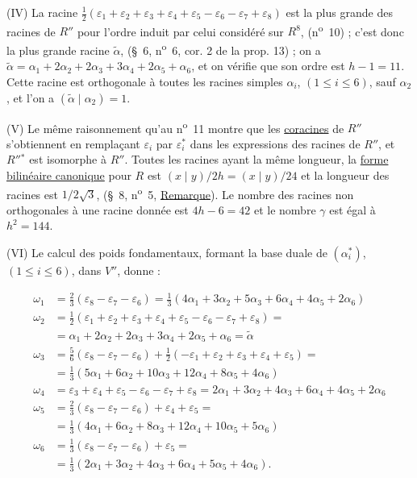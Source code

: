(IV) La racine $\frac{1}{2}(\varepsilon_1+\varepsilon_2+\varepsilon_3+\varepsilon_4+\varepsilon_5-\varepsilon_6-\varepsilon_7+\varepsilon_8)$ est la plus grande des racines de $R''$ pour l'ordre induit par celui considéré sur $R^8$, (n\textsuperscript{o}~10) ; c'est donc la plus grande racine $\tilde\alpha$, (\S~6, n\textsuperscript{o}~6, cor. 2 de la prop. 13) ; on a $\tilde\alpha=\alpha_1+2\alpha_2+2\alpha_3+3\alpha_4+2\alpha_5+\alpha_6$, et on vérifie que son ordre est $h-1=11$. Cette racine est orthogonale à toutes les racines simples $\alpha_i$, $(1\leq i\leq6)$, sauf $\alpha_2$, et l'on a $(\tilde\alpha\mid\alpha_2)=1$.

(V) Le même raisonnement qu'au n\textsuperscript{o}~11 montre que les \uline{coracines} de $R''$ s'obtiennent en remplaçant $\varepsilon_i$ par $\varepsilon_i^*$ dans les expressions des racines de $R''$, et $R''{}^*$ est isomorphe à $R''$. Toutes les racines ayant la même longueur, la \uline{forme bilinéaire canonique} pour $R$ est $(x\mid y)/2h=(x\mid y)/24$ et la longueur des racines est $1/2\sqrt{3}$, (\S~8, n\textsuperscript{o}~5, \uline{Remarque}). Le nombre des racines non orthogonales à une racine donnée est $4h-6=42$ et le nombre $\gamma$ est égal à $h^2=144$.

(VI) Le calcul des poids fondamentaux, formant la base duale de $(\alpha_i^*)$, $(1\leq i\leq6)$, dans $V''$, donne :

\[
\begin{aligned}
\omega_1&=\frac{2}{3}(\varepsilon_8-\varepsilon_7-\varepsilon_6)=\frac{1}{3}(4\alpha_1+3\alpha_2+5\alpha_3+6\alpha_4+4\alpha_5+2\alpha_6)\\
\omega_2&=\frac{1}{2}(\varepsilon_1+\varepsilon_2+\varepsilon_3+\varepsilon_4+\varepsilon_5-\varepsilon_6-\varepsilon_7+\varepsilon_8)=\\
&=\alpha_1+2\alpha_2+2\alpha_3+3\alpha_4+2\alpha_5+\alpha_6=\tilde\alpha\\
\omega_3&=\frac{5}{6}(\varepsilon_8-\varepsilon_7-\varepsilon_6)+\frac{1}{2}(-\varepsilon_1+\varepsilon_2+\varepsilon_3+\varepsilon_4+\varepsilon_5)=\\
&=\frac{1}{3}(5\alpha_1+6\alpha_2+10\alpha_3+12\alpha_4+8\alpha_5+4\alpha_6)\\
\omega_4&=\varepsilon_3+\varepsilon_4+\varepsilon_5-\varepsilon_6-\varepsilon_7+\varepsilon_8=2\alpha_1+3\alpha_2+4\alpha_3+6\alpha_4+4\alpha_5+2\alpha_6\\
\omega_5&=\frac{2}{3}(\varepsilon_8-\varepsilon_7-\varepsilon_6)+\varepsilon_4+\varepsilon_5=\\
&=\frac{1}{3}(4\alpha_1+6\alpha_2+8\alpha_3+12\alpha_4+10\alpha_5+5\alpha_6)\\
\omega_6&=\frac{1}{3}(\varepsilon_8-\varepsilon_7-\varepsilon_6)+\varepsilon_5=\\
&=\frac{1}{3}(2\alpha_1+3\alpha_2+4\alpha_3+6\alpha_4+5\alpha_5+4\alpha_6).
\end{aligned}
\]

